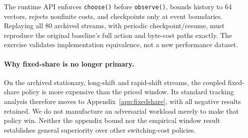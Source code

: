 The runtime API enforces \texttt{choose()} before \texttt{observe()}, bounds
history to 64 vectors, rejects nonfinite costs, and checkpoints only at event
boundaries. Replaying all 80 archived streams, with periodic checkpoint/resume,
must reproduce the original baseline's full action and byte-cost paths exactly.
The exercise validates implementation equivalence, not a new performance dataset.

\paragraph{Why fixed-share is no longer primary.}
On the archived stationary, long-shift and rapid-shift streams, the coupled
fixed-share policy is more expensive than the priced window. Its standard
tracking analysis therefore moves to Appendix~\ref{app:fixedshare}, with all
negative results retained. We do not manufacture an adversarial workload merely
to make that policy win. Neither the appendix bound nor the empirical window
result establishes general superiority over other switching-cost policies.
